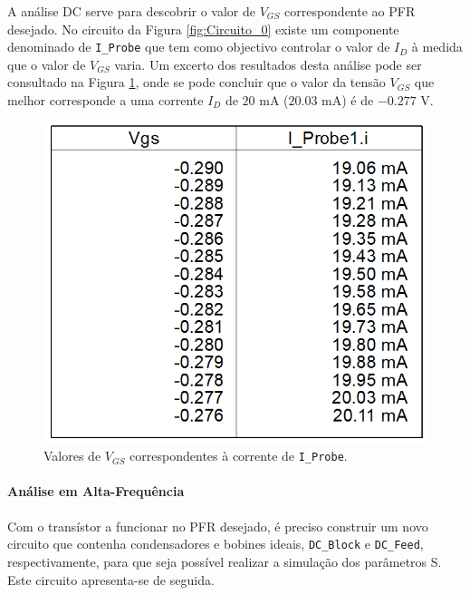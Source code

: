 \documentclass[11pt]{article}
\numberwithin{equation}{section}
\begin{document}
A análise DC serve para descobrir o valor de $ V_{GS} $ correspondente ao PFR desejado. No circuito da Figura \ref{fig:Circuito_0} existe um componente denominado de \texttt{I\_Probe} que tem como objectivo controlar o valor de $ I_{D} $ à medida que o valor de $ V_{GS} $ varia. Um excerto dos resultados desta análise pode ser consultado na Figura \ref{fig:VGS}, onde se pode concluir que o valor da tensão  $V_{GS}$ que melhor corresponde a uma corrente $I_{D}$ de $20$ mA ($20.03$ mA) é de $-0.277$ V.

\begin{figure}[H]
	\centering
	\includegraphics[keepaspectratio=true, scale=0.27]{exps/Vgs}
	\vspace{-0.5em}
	\caption{Valores de $V_{GS}$ correspondentes à corrente de \texttt{I\_Probe}.}
	\label{fig:VGS}
	\vspace{-0.8em}
\end{figure} 

\paragraph{Análise em Alta-Frequência} \hspace{0pt} 

Com o transístor a funcionar no PFR desejado, é preciso construir um novo circuito que contenha condensadores e bobines ideais, \texttt{DC\_Block} e \texttt{DC\_Feed}, respectivamente, para que seja possível realizar a simulação dos parâmetros S. Este circuito apresenta-se de seguida.
\end{document}
